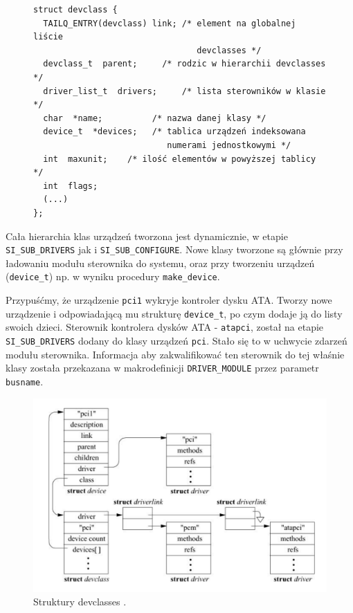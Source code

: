 \documentclass[shortabstract,inz]{iithesis}
\begin{document}
\begin{figure}
\begin{lstlisting}[caption=Struktura devclass]
struct devclass {
  TAILQ_ENTRY(devclass) link; /* element na globalnej liście 
                                 devclasses */
  devclass_t  parent;     /* rodzic w hierarchii devclasses */
  driver_list_t  drivers;     /* lista sterowników w klasie */
  char  *name;          /* nazwa danej klasy */
  device_t  *devices;   /* tablica urządzeń indeksowana 
                           numerami jednostkowymi */
  int  maxunit;    /* ilość elementów w powyższej tablicy */
  int  flags;
  (...)
};
\end{lstlisting}
\end{figure}

Cała hierarchia klas urządzeń tworzona jest dynamicznie, w etapie \\ 
\texttt{SI\_SUB\_DRIVERS} jak i \texttt{SI\_SUB\_CONFIGURE}.
Nowe klasy tworzone są głównie przy ładowaniu modułu sterownika do systemu, oraz
przy tworzeniu urządzeń (\texttt{device\_t}) np. w wyniku procedury \texttt{make\_device}.


Przypuśćmy, że urządzenie \texttt{pci1} wykryje kontroler dysku ATA. 
Tworzy nowe urządzenie i odpowiadającą mu strukturę \texttt{device\_t}, po czym 
dodaje ją do listy swoich dzieci.
Sterownik kontrolera dysków ATA - \texttt{atapci}, został na etapie \\ \texttt{SI\_SUB\_DRIVERS}
dodany do klasy urządzeń \texttt{pci}. Stało się to w uchwycie zdarzeń modułu sterownika.
Informacja aby zakwalifikować ten sterownik do tej właśnie klasy została przekazana 
w makrodefinicji \texttt{DRIVER\_MODULE} przez parametr \texttt{busname}.

\begin{figure}
  \begin{center}
    \includegraphics[width=\linewidth]{devclasses}
  \caption{Struktury devclasses \cite{image:freebsdbook1}.}
\end{center}
\end{figure}
\end{document}
